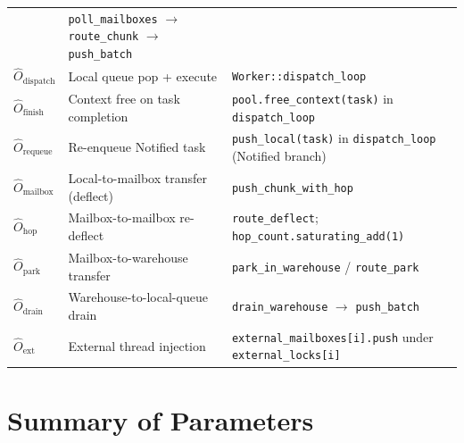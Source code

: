 \documentclass[11pt,a4paper]{article}
\newcommand{\code}[1]{\texttt{#1}}
\begin{document}
\begin{table}[H]
\begin{tabular}{>{\ttfamily}p{3.4cm} p{4.5cm} p{5.5cm}}
  & \code{poll\_mailboxes} $\to$ \code{route\_chunk} $\to$ \code{push\_batch} \\
$\hat{O}_{\text{dispatch}}$   & Local queue pop + execute
  & \code{Worker::dispatch\_loop} \\
$\hat{O}_{\text{finish}}$     & Context free on task completion
  & \code{pool.free\_context(task)} in \code{dispatch\_loop} \\
$\hat{O}_{\text{requeue}}$    & Re-enqueue Notified task
  & \code{push\_local(task)} in \code{dispatch\_loop} (Notified branch) \\
$\hat{O}_{\text{mailbox}}$    & Local-to-mailbox transfer (deflect)
  & \code{push\_chunk\_with\_hop} \\
$\hat{O}_{\text{hop}}$        & Mailbox-to-mailbox re-deflect
  & \code{route\_deflect}; \code{hop\_count.saturating\_add(1)} \\
$\hat{O}_{\text{park}}$       & Mailbox-to-warehouse transfer
  & \code{park\_in\_warehouse} / \code{route\_park} \\
$\hat{O}_{\text{drain}}$      & Warehouse-to-local-queue drain
  & \code{drain\_warehouse} $\to$ \code{push\_batch} \\
$\hat{O}_{\text{ext}}$        & External thread injection
  & \code{external\_mailboxes[i].push} under \code{external\_locks[i]} \\
\bottomrule
\end{tabular}
\end{table}

\section{Summary of Parameters}
\end{document}
